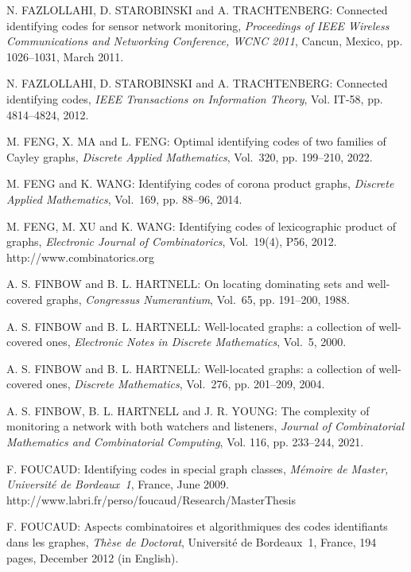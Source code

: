 \begin{thebibliography}{999}
N. FAZLOLLAHI, D. STAROBINSKI and A. TRACHTENBERG: Connected identifying codes for sensor network monitoring, {\it Proceedings of IEEE Wireless Communications and Networking Conference, WCNC 2011}, Cancun, Mexico, pp. 1026--1031, March 2011.

N. FAZLOLLAHI, D. STAROBINSKI and A. TRACHTENBERG: Connected identifying codes, {\it IEEE Transactions on Information Theory}, Vol. IT-58, pp. 4814--4824, 2012.

M. FENG, X. MA and L. FENG: Optimal identifying codes of two families of Cayley graphs, {\it Discrete Applied Mathematics}, Vol.~320, pp. 199--210, 2022.

M. FENG and K. WANG: Identifying codes of corona product graphs, {\it Discrete Applied Mathematics}, Vol.~169, pp. 88--96, 2014.

M. FENG, M. XU and K. WANG: Identifying codes of lexicographic product of graphs, {\it Electronic Journal of Combinatorics}, Vol.~19(4), P56, 2012.\\
http://www.combinatorics.org

A. S. FINBOW and B. L. HARTNELL: On locating dominating sets and well-covered graphs, {\it Congressus Numerantium}, Vol.~65, pp. 191--200, 1988.

A. S. FINBOW and B. L. HARTNELL: Well-located graphs: a collection of well-covered ones, {\it Electronic Notes in Discrete Mathematics}, Vol.~5, 2000.

A. S. FINBOW and B. L. HARTNELL: Well-located graphs: a collection of well-covered ones, {\it Discrete Mathematics}, Vol.~276, pp. 201--209, 2004.

A. S. FINBOW, B. L. HARTNELL and J. R. YOUNG: The complexity of monitoring a network with both watchers and listeners, {\it Journal of Combinatorial Mathematics and Combinatorial Computing}, Vol. 116, pp. 233--244, 2021.

F. FOUCAUD: Identifying codes in special graph classes, {\it M\'emoire de Master, Universit\'e de Bordeaux~1}, France, June 2009.\\
http://www.labri.fr/perso/foucaud/Research/MasterThesis

F. FOUCAUD: Aspects combinatoires et algorithmiques des codes identifiants dans les graphes, {\it Th\`ese de Doctorat}, Universit\'e de Bordeaux~1, France, 194 pages, December 2012 (in English).


\end{thebibliography}
